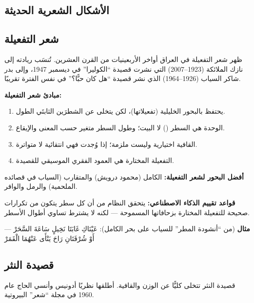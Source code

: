 \begin{otherlanguage}{arabic}

\section*{الأشكال الشعرية الحديثة}

\subsection*{شعر التفعيلة}

ظهر شعر التفعيلة في العراق أواخر الأربعينيات من القرن العشرين. تُنسَب ريادته إلى نازك الملائكة (1923–2007) التي نشرت قصيدة ``الكوليرا'' في ديسمبر 1947، وإلى بدر شاكر السياب (1926–1964) الذي نشر قصيدة ``هل كان حبًّا؟'' في نفس الفترة تقريبًا.

\textbf{مبادئ شعر التفعيلة:}
\begin{enumerate}
  \item يحتفظ بالبحور الخليلية (تفعيلاتها)، لكن يتخلى عن الشطرَين الثابتَي الطول.
  \item الوحدة هي السطر () لا البيت؛ وطول السطر متغير حسب المعنى والإيقاع.
  \item القافية اختيارية وليست ملزمة؛ إذا وُجدت فهي انتقائية لا متواترة.
  \item التفعيلة المختارة هي العمود الفقري الموسيقي للقصيدة.
\end{enumerate}

\textbf{أفضل البحور لشعر التفعيلة:} الكامل (محمود درويش) والمتقارب (السياب في قصائده الملحمية) والرمل والوافر.

\textbf{قواعد تقييم الذكاء الاصطناعي:} يتحقق النظام من أن كل سطر يتكون من تكرارات صحيحة للتفعيلة المختارة بزحافاتها المسموحة — لكنه لا يشترط تساوي أطوال الأسطر.

\textbf{مثال} (من ``أنشودة المطر'' للسياب على بحر الكامل):
عَيْنَاكِ غَابَتَا نَخِيلٍ سَاعَةَ السَّحَرْ --- أَوْ شُرْفَتَانِ رَاحَ يَنْأَى عَنْهُمَا الْقَمَرْ

\subsection*{قصيدة النثر}

قصيدة النثر تتخلى كليًّا عن الوزن والقافية. أطلقها نظريًا أدونيس وأنسي الحاج عام 1960 في مجلة ``شعر'' البيروتية.


\end{otherlanguage}

